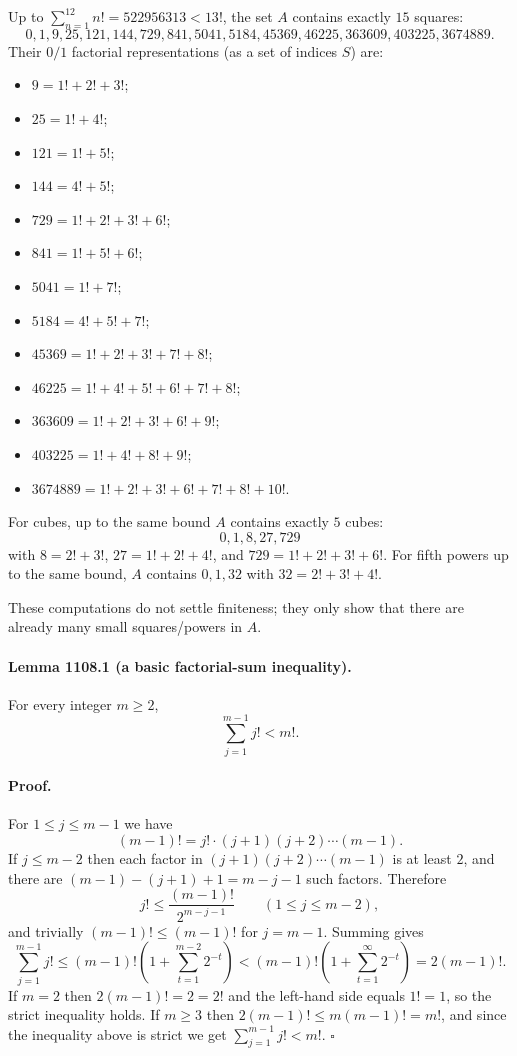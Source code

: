 Up to $\sum_{n=1}^{12} n! = 522956313 < 13!$, the set $A$ contains exactly $15$ squares:
\[
0,1,9,25,121,144,729,841,5041,5184,45369,46225,363609,403225,3674889.
\]
Their $0/1$ factorial representations (as a set of indices $S$) are:
\begin{itemize}
\item $9=1!+2!+3!$;
\item $25=1!+4!$;
\item $121=1!+5!$;
\item $144=4!+5!$;
\item $729=1!+2!+3!+6!$;
\item $841=1!+5!+6!$;
\item $5041=1!+7!$;
\item $5184=4!+5!+7!$;
\item $45369=1!+2!+3!+7!+8!$;
\item $46225=1!+4!+5!+6!+7!+8!$;
\item $363609=1!+2!+3!+6!+9!$;
\item $403225=1!+4!+8!+9!$;
\item $3674889=1!+2!+3!+6!+7!+8!+10!$.
\end{itemize}
For cubes, up to the same bound $A$ contains exactly $5$ cubes:
\[0,1,8,27,729\]
with $8=2!+3!$, $27=1!+2!+4!$, and $729=1!+2!+3!+6!$.
For fifth powers up to the same bound, $A$ contains $0,1,32$ with $32=2!+3!+4!$.

These computations do not settle finiteness; they only show that there are already many small squares/powers in $A$.

\paragraph{Lemma 1108.1 (a basic factorial-sum inequality).}
For every integer $m\ge 2$,
\[\sum_{j=1}^{m-1} j! < m!.\]

\paragraph{Proof.}
For $1\le j\le m-1$ we have
\[(m-1)! = j!\cdot (j+1)(j+2)\cdots(m-1).\]
If $j\le m-2$ then each factor in $(j+1)(j+2)\cdots(m-1)$ is at least $2$, and there are $(m-1)-(j+1)+1 = m-j-1$ such factors. Therefore
\[j!\le \frac{(m-1)!}{2^{m-j-1}}\qquad (1\le j\le m-2),\]
and trivially $(m-1)!\le (m-1)!$ for $j=m-1$.
Summing gives
\[\sum_{j=1}^{m-1} j! \le (m-1)!\left(1+\sum_{t=1}^{m-2} 2^{-t}\right) < (m-1)!\left(1+\sum_{t=1}^{\infty} 2^{-t}\right) = 2(m-1)!.\]
If $m=2$ then $2(m-1)!=2=2!$ and the left-hand side equals $1! =1$, so the strict inequality holds.
If $m\ge 3$ then $2(m-1)!\le m(m-1)! = m!$, and since the inequality above is strict we get $\sum_{j=1}^{m-1} j! < m!$.
\hfill $\square$

